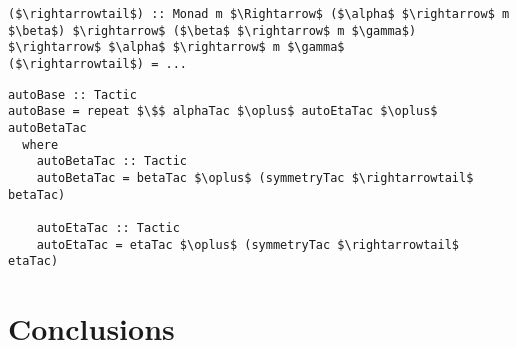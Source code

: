 \documentclass{llncs}
\begin{document}
\begin{lstlisting}
($\rightarrowtail$) :: Monad m $\Rightarrow$ ($\alpha$ $\rightarrow$ m $\beta$) $\rightarrow$ ($\beta$ $\rightarrow$ m $\gamma$) $\rightarrow$ $\alpha$ $\rightarrow$ m $\gamma$
($\rightarrowtail$) = ...
\end{lstlisting}

\begin{lstlisting}
autoBase :: Tactic
autoBase = repeat $\$$ alphaTac $\oplus$ autoEtaTac $\oplus$ autoBetaTac
  where
    autoBetaTac :: Tactic
    autoBetaTac = betaTac $\oplus$ (symmetryTac $\rightarrowtail$ betaTac)

    autoEtaTac :: Tactic
    autoEtaTac = etaTac $\oplus$ (symmetryTac $\rightarrowtail$ etaTac)
\end{lstlisting}

\section{Conclusions}
\label{sect.conclusions}


\end{document}

